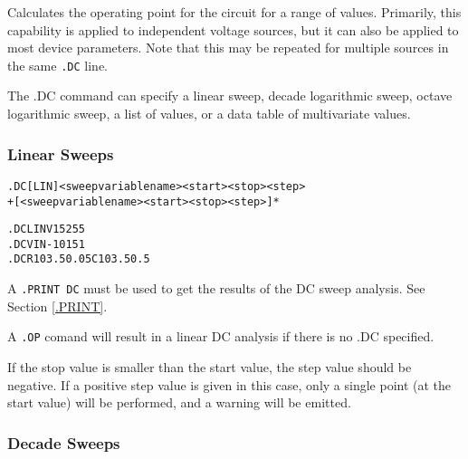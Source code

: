 


Calculates the operating point for the circuit for a
range of values.  Primarily, this capability is applied to independent
voltage sources, but it can also be applied to most device parameters.
Note that this may be repeated for multiple sources in the
same \texttt{.DC} line.

The .DC command can specify a linear sweep, decade logarithmic sweep,
octave logarithmic sweep, a list of values, or a data table of multivariate values.

\subsubsection{Linear Sweeps}
 

\begin{Command}
\format
\begin{alltt}
.DC [LIN] <sweep variable name> <start> <stop> <step>
+ [<sweep variable name> <start> <stop> <step>]*
\end{alltt}

\examples
\begin{alltt}
.DC LIN V1 5 25 5
.DC VIN -10 15 1
.DC R1 0 3.5 0.05 C1 0 3.5 0.5
\end{alltt}

\comments
A \texttt{.PRINT DC} must be used to get the results of the DC sweep
analysis.  See Section \ref{.PRINT}.

A \texttt{.OP} comand will result in a linear DC analysis if there is no .DC specified.

If the stop value is smaller than the start value, the step value
should be negative.  If a positive step value is given in this case,
only a single point (at the start value) will be performed, and a
warning will be emitted.

\end{Command}

\subsubsection{Decade Sweeps}
 


